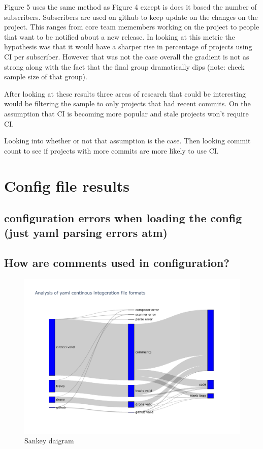 \documentclass[twoside,12pt,titlepage,a4paper]{article}
\begin{document}
Figure 5 uses the same method as Figure 4 except is does it based the number of subscribers. Subscribers are used on github to keep update on the changes on the project. This ranges from core team memembers working on the project to people that want to be notified about a new release. 
In looking at this metric the hypothesis was that it would have a sharper rise in percentage of projects using CI per subscriber. However that was not the case overall the gradient is not as strong along with the fact that the final group dramatically dips (note: check sample size of that group).

After looking at these results three areas of research that could be interesting would be filtering the sample to only projects that had recent commits. On the assumption that CI is becoming more popular and stale projects won't require CI.

Looking into whether or not that assumption is the case. Then looking commit count to see if projects with more commits are more likely to use CI.

\section{Config file results}

\vspace*{-0.05in}
\subsection{configuration errors when loading the config (just yaml parsing errors atm)}
\vspace*{-0.05in}




\vspace*{-0.05in}
\subsection{How are comments used in configuration?}
\vspace*{-0.05in}

\begin{figure}[h]
  \centering
  \includegraphics[width=\textwidth]{../src/results/sankey.pdf}
  \caption[alt text]{Sankey daigram}
\end{figure}
\end{document}
